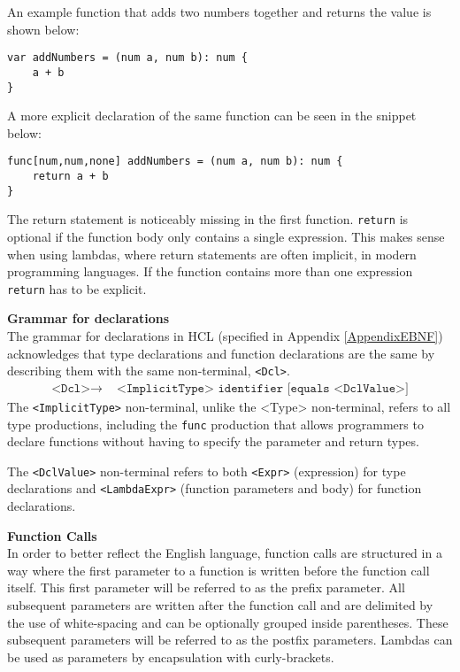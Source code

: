 An example function that adds two numbers together and returns the value is shown below:
\begin{lstlisting}[language=HCL,label=lis:addNumbers,firstnumber=1]
var addNumbers = (num a, num b): num {
    a + b
}
\end{lstlisting} 
A more explicit declaration of the same function can be seen in the snippet below:
\begin{lstlisting}[language=HCL,label=lis:hclExplicitTypeDcls,firstnumber=1]
func[num,num,none] addNumbers = (num a, num b): num {
	return a + b
}
\end{lstlisting}

The return statement is noticeably missing in the first function.
\texttt{return} is optional if the function body only contains a single expression. 
This makes sense when using lambdas, where return statements are often implicit, in modern programming languages. 
If the function contains more than one expression \texttt{return} has to be explicit.

\textbf{Grammar for declarations}\\
The grammar for declarations in HCL (specified in Appendix \ref{AppendixEBNF}) acknowledges that type declarations and function declarations are the same by describing them with the same non-terminal, \texttt{<Dcl>}.
\begin{align*}
	\texttt{<Dcl>}\to & \texttt{ <ImplicitType> identifier [equals <DclValue>]}
\end{align*}
The \texttt{<ImplicitType>} non-terminal, unlike the <Type> non-terminal, refers to all type productions, including the \texttt{func} production that allows programmers to declare functions without having to specify the parameter and return types.

The \texttt{<DclValue>} non-terminal refers to both \texttt{<Expr>} (expression) for type declarations and \texttt{<LambdaExpr>} (function parameters and body) for function declarations.

\textbf{Function Calls}\\
In order to better reflect the English language, function calls are structured in a way where the first parameter to a function is written before the function call itself.
This first parameter  will be referred to as the prefix parameter. 
All subsequent parameters are written after the function call and are delimited by the use of white-spacing and can be optionally grouped inside parentheses.
These subsequent parameters will be referred to as the postfix parameters.
Lambdas can be used as parameters by encapsulation with curly-brackets. 

